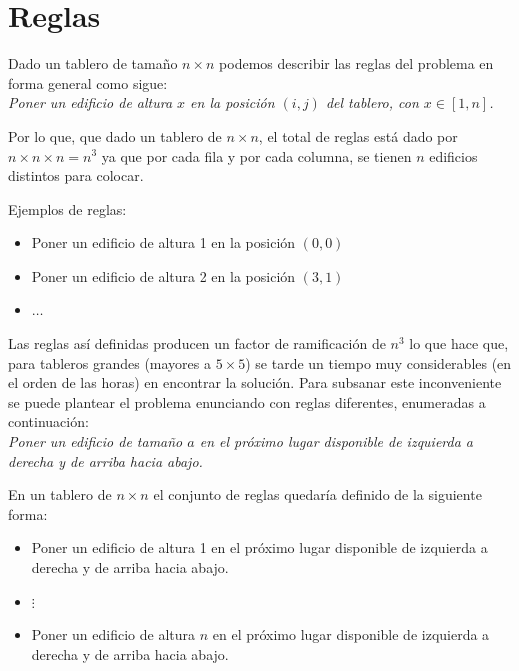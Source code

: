 \documentclass[%
	final,
	reprint,
	notitlepage,
	narroweqnarray,
	inline,
	twoside,
	invited
	]{ieee}
\begin{document}
\section{Reglas}

\par Dado un tablero de tamaño $n\times n$ podemos describir las reglas del problema en forma general como sigue:\\

\emph{Poner un edificio de altura $x$ en la posición $(i,j)$ del tablero, con $x \in [1, n]$.}\\

\par Por lo que, que dado un tablero de $n\times n$, el total de reglas está dado por $n \times {n \times n} = n^3$ ya que por cada fila y por cada columna, se tienen $n$ edificios distintos para colocar. 
\par Ejemplos de reglas:
\begin{itemize}
\item Poner un edificio de altura 1 en la posición $(0,0)$
\item Poner un edificio de altura 2 en la posición $(3,1)$
\item $\ldots$

\end{itemize}

\par Las reglas así definidas producen un factor de ramificación de $n^3$ lo que hace que, para tableros grandes (mayores a $5\times5$) se tarde un tiempo muy considerables (en el orden de las horas) en encontrar la solución. Para subsanar este inconveniente se puede plantear el problema enunciando con reglas diferentes, enumeradas a continuación:\\

\emph{Poner un edificio de tamaño $a$ en el próximo lugar disponible de izquierda a derecha y de arriba hacia abajo.}\\

\par En un tablero de $n\times n$ el conjunto de reglas quedaría definido de la siguiente forma:\\

\begin{itemize}
\item Poner un edificio de altura 1 en el próximo lugar disponible de izquierda a derecha y de arriba hacia abajo.
\item $\vdots$
\item Poner un edificio de altura $n$ en el próximo lugar disponible de izquierda a derecha y de arriba hacia abajo.
\end{itemize}
\end{document}
